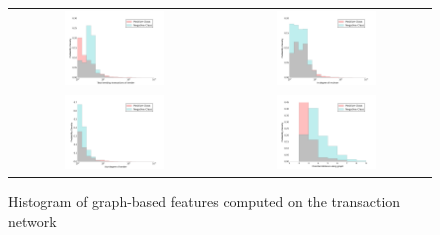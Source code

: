 \documentclass{article} %
\begin{document}
\begin{figure}[!hbt]
\begin{tabular}{cc}
\includegraphics[width=0.5\textwidth]{figs/hist_out.png} & 
\includegraphics[width=0.5\textwidth]{figs/hist_in_deg.png} \\ 
\includegraphics[width=0.5\textwidth]{figs/hist_out_deg.png} & 
\includegraphics[width=0.5\textwidth]{figs/hist_dist.png}  
\end{tabular}
\label{fig:hist}
\caption{Histogram of graph-based features computed on the transaction network}
\end{figure}
\end{document}
